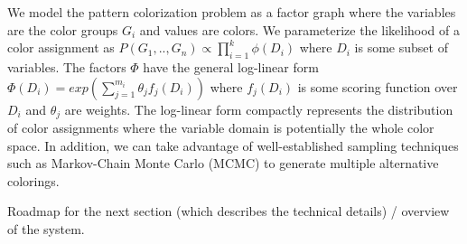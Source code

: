 
We model the pattern colorization problem as a factor graph where the variables are the color groups $G_i$ and values are colors. We parameterize the likelihood of a color assignment as $P(G_1,..,G_n) \propto \prod_{i=1}^{k} \phi(D_i)$ where $D_i$ is some subset of variables. The factors $\Phi$ have the general log-linear form $\Phi(D_i) = exp(\sum_{j=1}^{m_i} \theta_j f_j(D_i))$ where $f_j(D_i)$ is some scoring function over $D_i$ and $\theta_j$ are weights. The log-linear form compactly represents the distribution of color assignments where the variable domain is potentially the whole color space. In addition, we can take advantage of well-established sampling techniques such as Markov-Chain Monte Carlo (MCMC) to generate multiple alternative colorings.



Roadmap for the next section (which describes the technical details) / overview of the system.